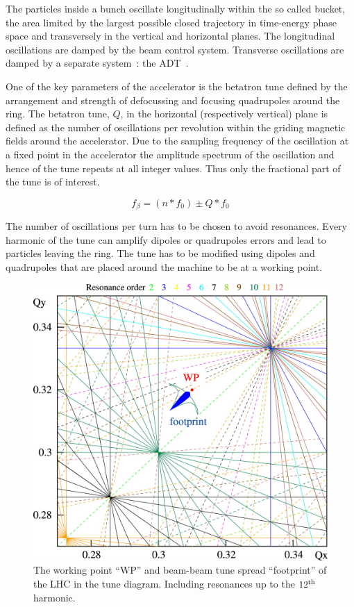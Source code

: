 The particles inside a bunch oscillate longitudinally within the so called bucket, the area limited by the largest possible closed trajectory in time-energy phase space and transversely in the vertical and horizontal planes. The longitudinal oscillations are damped by the beam control system. Transverse oscillations are damped by a separate system~: the \gls{ADT}~\cite{Zhabitsky:1141925,Benews11}.

One of the key parameters of the accelerator is the betatron tune defined by the arrangement and strength of defocussing and focusing quadrupoles around the ring. The betatron tune, $Q$, in the horizontal (respectively vertical) plane is defined as the number of oscillations per revolution within the griding magnetic fields around the accelerator. Due to the sampling frequency of the oscillation at a fixed point in the accelerator the amplitude spectrum of the oscillation and hence of the tune repeats at all integer values. Thus only the fractional part of the tune is of interest.

$$ f_{\beta} = (n * f_{0}) \pm Q * f_{0} $$

The number of oscillations per turn has to be chosen to avoid resonances. Every harmonic of the tune can amplify dipoles or quadrupoles errors and lead to particles leaving the ring. The tune has to be modified using dipoles and quadrupoles that are placed around the machine to be at a working point.

\begin{figure}[H]
\centering
\caption{The working point ``WP'' and beam-beam tune spread ``footprint'' of the LHC in the tune diagram. Including resonances up to the $12^{\rm {th}}$ harmonic.}
\includegraphics[scale=1.25]{lhc_working_point.jpeg}
\end{figure}

